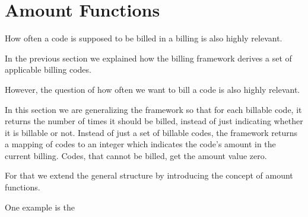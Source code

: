 \section{Amount Functions}\label{sec:amount-functions}


How often a code is supposed to be billed in a billing is also highly relevant.

In the previous section we explained how the billing framework derives a set of applicable billing codes.

However, the question of how often we want to bill a code is also highly relevant.

In this section we are generalizing the framework so that for each billable code, it returns the number of times it should be billed, instead of just indicating whether it is billable or not.
Instead of just a set of billable codes, the framework returns a mapping of codes to an integer which indicates the code's amount in the current billing.
Codes, that cannot be billed, get the amount value zero.

For that we extend the general structure by introducing the concept of amount functions.


One example is the
